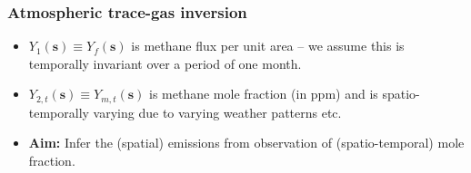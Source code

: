 \documentclass{beamer}
\newcommand{\svec} {\textbf{s}}
\newcommand{\uvec} {\textbf{u}}
\begin{document}
\begin{frame}
\frametitle{Atmospheric trace-gas inversion}

\begin{itemize}
\item $Y_1(\svec) \equiv Y_f(\svec)$ is methane flux per unit area -- we assume this is temporally invariant over a period of one month. \vfill
\item $Y_{2,t}(\svec) \equiv Y_{m,t}(\svec)$ is methane mole fraction (in ppm) and is spatio-temporally varying due to varying weather patterns etc. \vfill
\item {\bf Aim:} Infer the (spatial) emissions from observation of (spatio-temporal) mole fraction.\vfill
\end{itemize}
\end{frame}
\end{document}

